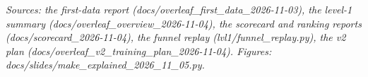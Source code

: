 \documentclass[11pt]{article}
\begin{document}
\vspace{1em}
{\sloppy\textit{Sources: the first-data report (docs/overleaf\_first\_data\_2026-11-03), the level-1 summary
(docs/overleaf\_overview\_2026-11-04), the scorecard and ranking reports (docs/scorecard\_2026-11-04), the funnel replay
(lvl1/funnel\_replay.py), the v2 plan (docs/overleaf\_v2\_training\_plan\_2026-11-04). Figures:
docs/slides/make\_explained\_2026\_11\_05.py.}\par}
\end{document}
